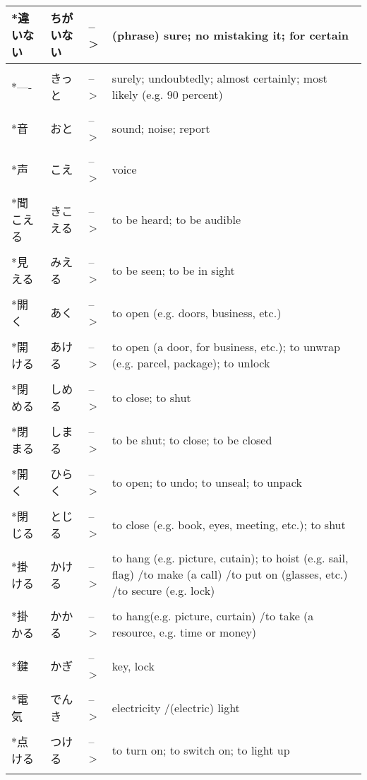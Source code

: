 \documentclass{article}
\begin{document}
\begin{tabular}{ l | l l p{13cm} }
*違いない&ちがいない&-->& (phrase) sure; no mistaking it; for certain \\ \hline\\[-1em]
*----&きっと&-->& surely; undoubtedly; almost certainly; most likely (e.g. 90 percent) \\ \hline\\[-1em]
*音&おと&-->& sound; noise; report \\ \hline\\[-1em]
*声&こえ&-->& voice \\ \hline\\[-1em]
*聞こえる&きこえる&-->& to be heard; to be audible \\ \hline\\[-1em]
*見える&みえる&-->& to be seen; to be in sight \\ \hline\\[-1em]
*開く&あく&-->& to open (e.g. doors, business, etc.) \\ \hline\\[-1em]
*開ける&あける&-->& to open (a door, for business, etc.); to unwrap (e.g. parcel, package); to unlock \\ \hline\\[-1em]
*閉める&しめる&-->& to close; to shut \\ \hline\\[-1em]
*閉まる&しまる&-->& to be shut; to close; to be closed \\ \hline\\[-1em]
*開く&ひらく&-->& to open; to undo; to unseal; to unpack \\ \hline\\[-1em]
*閉じる&とじる&-->& to close (e.g. book, eyes, meeting, etc.); to shut \\ \hline\\[-1em]
*掛ける&かける&-->& to hang (e.g. picture, cutain); to hoist (e.g. sail, flag) /to make (a call) /to put on (glasses, etc.) /to secure (e.g. lock) \\ \hline\\[-1em]
*掛かる&かかる&-->& to hang(e.g. picture, curtain) /to take (a resource, e.g. time or money) \\ \hline\\[-1em]
*鍵&かぎ&-->& key, lock \\ \hline\\[-1em]
*電気&でんき&-->& electricity /(electric) light \\ \hline\\[-1em]
*点ける&つける&-->& to turn on; to switch on; to light up \\ \hline\\[-1em]

\end{tabular}
\end{document}
